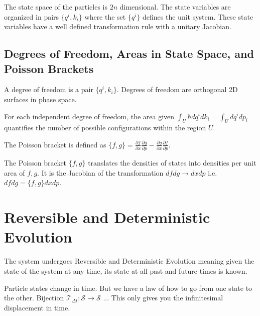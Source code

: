 \documentclass{article}
\begin{document}
\begin{prop}
	The state space of the particles is $2n$ dimensional. The state variables are organized in pairs $\{q^i, k_i\}$ where the set $\{q^i\}$ defines the unit system. These state variables have a well defined transformation rule with a unitary Jacobian.
\end{prop}

\subsection{Degrees of Freedom, Areas in State Space, and Poisson Brackets}

\begin{defn}
	A degree of freedom is a pair $\{q^i,k_i\}$. Degrees of freedom are orthogonal 2D surfaces in phase space.
\end{defn}
	
\begin{prop}
	For each independent degree of freedom, the area given $\int_U \hbar dq^i dk_i = \int_U dq^i dp_i$ quantifies the number of possible configurations within the region $U$.
\end{prop}

\begin{defn}
	The Poisson bracket is defined as $\{f,g\} = \frac{\partial f}{\partial x}\frac{\partial g}{\partial p} - \frac{\partial g}{\partial x}\frac{\partial f}{\partial p}$.
\end{defn}

\begin{prop}
	The Poisson bracket $\{f, g\}$ translates the densities of states into densities per unit area of $f, g$. It is the Jacobian of the transformation $dfdg \rightarrow dxdp$ i.e. $dfdg = \{f,g\}dxdp$.
\end{prop}
	
\section{Reversible and Deterministic Evolution}

\begin{assump}
	The system undergoes Reversible and Deterministic Evolution meaning given the state of the system at any time, its state at all past and future times is known.
\end{assump}

Particle states change in time. But we have a law of how to go from one state to the other. Bijection $\mathcal{T}_{\Delta t} : \mathcal{S} \to \mathcal{S}$ ... This only gives you the infinitesimal displacement in time.
\end{document}
